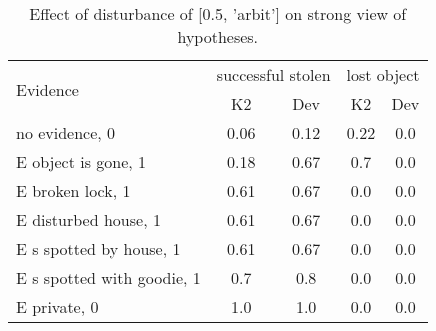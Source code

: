 \begin{table}\begin{tabular}{l|cc|cc}\toprule\multirow{2}{*}{Evidence} & \multicolumn{2}{c}{successful stolen}& \multicolumn{2}{c}{lost object}\\& {K2} & {Dev}& {K2} & {Dev}\\\midrule
no evidence, 0 & \cellcolor{Bittersweet}0.06&\cellcolor{Bittersweet}0.12&\cellcolor{Bittersweet}0.22&\cellcolor{Bittersweet}0.0\\E object is gone, 1 & \cellcolor{Bittersweet}0.18&\cellcolor{Bittersweet}0.67&\cellcolor{Bittersweet}0.7&\cellcolor{Bittersweet}0.0\\E broken lock, 1 & \cellcolor{Bittersweet}0.61&\cellcolor{Bittersweet}0.67&0.0&0.0\\E disturbed house, 1 & \cellcolor{Bittersweet}0.61&\cellcolor{Bittersweet}0.67&0.0&0.0\\E s spotted by house, 1 & \cellcolor{Bittersweet}0.61&\cellcolor{Bittersweet}0.67&0.0&0.0\\E s spotted with goodie, 1 & \cellcolor{Bittersweet}0.7&\cellcolor{Bittersweet}0.8&0.0&0.0\\E private, 0 & 1.0&1.0&0.0&0.0\\\bottomrule\end{tabular}\caption{Effect of disturbance of [0.5, 'arbit'] on strong view of hypotheses.}\end{table}